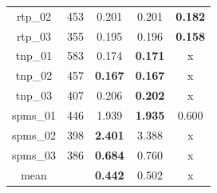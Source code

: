 \documentclass[letterpaper, 10 pt, conference]{ieeeconf}  %
\begin{document}
\begin{table}[htb!]
\begin{tabular}{c|c|c|c|c}
                rtp\_02              & 453      & 0.201                    & 0.201                      & \textbf{0.182}           \\
                rtp\_03              & 355      & 0.195                    & 0.196                      & \textbf{0.158}           \\
                tnp\_01              & 583      & 0.174                    & \textbf{0.171}             & x                        \\
                tnp\_02              & 457      & \textbf{0.167}           & \textbf{0.167}             & x                        \\
                tnp\_03              & 407      & 0.206                    & \textbf{0.202}             & x                        \\
                spms\_01             & 446      & 1.939                    & \textbf{1.935}             & 0.600                    \\
                spms\_02             & 398      & \textbf{2.401}           & 3.388                      & x                        \\
                spms\_03             & 386      & \textbf{0.684}           & 0.760                      & x                        \\
                \midrule
                mean                 &          & \textbf{0.442}           & 0.502                      & x                        \\
                \bottomrule
        \end{tabular}
        \label{tab_viral}
\end{table}
\end{document}
